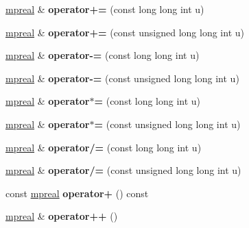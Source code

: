 \begin{DoxyCompactItemize}
\hyperlink{classmpfr_1_1mpreal}{mpreal} \& {\bfseries operator+=} (const long long int u)
\item 
\mbox{\label{classmpfr_1_1mpreal_a5004a9dd8ccccc844c60136d01e9bc21}} 
\hyperlink{classmpfr_1_1mpreal}{mpreal} \& {\bfseries operator+=} (const unsigned long long int u)
\item 
\mbox{\label{classmpfr_1_1mpreal_a219bc066b3e375afd73cbc8e21996ced}} 
\hyperlink{classmpfr_1_1mpreal}{mpreal} \& {\bfseries operator-\/=} (const long long int u)
\item 
\mbox{\label{classmpfr_1_1mpreal_a82399fca46bb9656b491d5f692d691d0}} 
\hyperlink{classmpfr_1_1mpreal}{mpreal} \& {\bfseries operator-\/=} (const unsigned long long int u)
\item 
\mbox{\label{classmpfr_1_1mpreal_a1e3ab2ec07658fb264b2f49a23f35f20}} 
\hyperlink{classmpfr_1_1mpreal}{mpreal} \& {\bfseries operator$\ast$=} (const long long int u)
\item 
\mbox{\label{classmpfr_1_1mpreal_a4d6a36e32651322bc0dc90860669b50f}} 
\hyperlink{classmpfr_1_1mpreal}{mpreal} \& {\bfseries operator$\ast$=} (const unsigned long long int u)
\item 
\mbox{\label{classmpfr_1_1mpreal_a0096c4932ec60f18644fbed6908e60f2}} 
\hyperlink{classmpfr_1_1mpreal}{mpreal} \& {\bfseries operator/=} (const long long int u)
\item 
\mbox{\label{classmpfr_1_1mpreal_a6c863f55802ed18c4742375cbd6be536}} 
\hyperlink{classmpfr_1_1mpreal}{mpreal} \& {\bfseries operator/=} (const unsigned long long int u)
\item 
\mbox{\label{classmpfr_1_1mpreal_a3f7f5d20cfe5d4d5cbcee9ad7b450ca3}} 
const \hyperlink{classmpfr_1_1mpreal}{mpreal} {\bfseries operator+} () const
\item 
\mbox{\label{classmpfr_1_1mpreal_aa55a5f881ca45989f413660159a3f411}} 
\hyperlink{classmpfr_1_1mpreal}{mpreal} \& {\bfseries operator++} ()
\item 

\end{DoxyCompactItemize}
